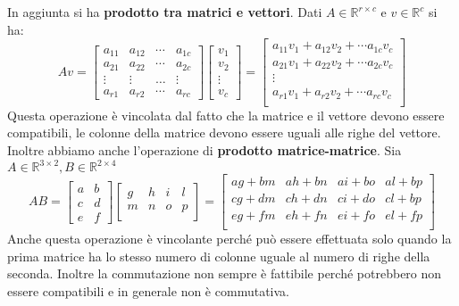 In aggiunta si ha \textbf{prodotto tra matrici e vettori}. Dati $A\in \mathbb{R}^{r\times c}$
e $v\in \mathbb{R}^{c}$ si ha:
\begin{equation*}
    Av = \left[\begin{array}{cccc}
            a_{11} & a_{12} & \cdots & a_{1c} \\
            a_{21} & a_{22} & \cdots & a_{2c} \\
            \vdots & \vdots & \dots  & \vdots \\
            a_{r1} & a_{r2} & \cdots & a_{rc}
        \end{array}\right] \left[\begin{array}{c}
            v_1 \\v_2\\\vdots\\v_c
        \end{array}\right] = \left[\begin{array}{c}
            a_{11}v_1+a_{12}v_2+\cdots a_{1c}v_c \\
            a_{21}v_1+a_{22}v_2+\cdots a_{2c}v_c \\
            \vdots                               \\
            a_{r1}v_1+a_{r2}v_2+\cdots a_{rc}v_c \\
        \end{array}\right]
\end{equation*}
Questa operazione è vincolata dal fatto che la matrice e il vettore devono
essere compatibili, le colonne della matrice devono essere uguali alle righe del
vettore. Inoltre abbiamo anche l'operazione di \textbf{prodotto matrice-matrice}.
Sia $A\in \mathbb{R}^{3\times 2}, B\in \mathbb{R}^{2\times 4}$
\begin{equation*}
    AB = \left[\begin{array}{cc}
            a & b \\
            c & d \\
            e & f
        \end{array}\right]\left[\begin{array}{cccc}
            g & h & i & l \\
            m & n & o & p \\
        \end{array}\right] = \left[\begin{array}{cccc}
            ag+bm & ah+bn & ai+bo & al+bp \\
            cg+dm & ch+dn & ci+do & cl+bp \\
            eg+fm & eh+fn & ei+fo & el+fp \\
        \end{array}\right]
\end{equation*}
Anche questa operazione è vincolante perché può essere effettuata solo quando la
prima matrice ha lo stesso numero di colonne uguale al numero di righe della
seconda. Inoltre la commutazione non sempre è fattibile perché potrebbero non
essere compatibili e in generale non è commutativa.